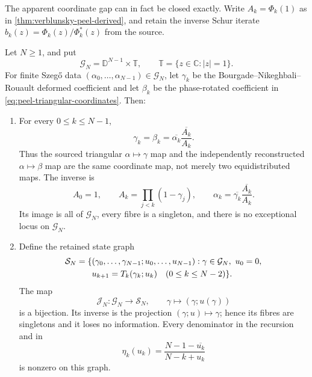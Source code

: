 \begin{sloppypar}
The apparent coordinate gap can in fact be closed exactly.  Write
$A_k=\Phi_k(1)$ as in \cref{thm:verblunsky-peel-derived}, and retain the inverse Schur
iterate $b_k(z)=\Phi_k(z)/\Phi_k^*(z)$ from the source.

\begin{theorem}
\label{thm:gamma-beta-jet-lift}
Let $N\geq1$, and put
\[
 \mathcal G_N=\mathbb D^{N-1}\times\mathbb T,
 \qquad \mathbb T=\{z\in\mathbb C:|z|=1\}.
\]
For finite Szeg\H{o} data
$(\alpha_0,\ldots,\alpha_{N-1})\in\mathcal G_N$, let
$\gamma_k$ be the Bourgade--Nikeghbali--Rouault deformed coefficient and let
$\beta_k$ be the phase-rotated coefficient in
\eqref{eq:peel-triangular-coordinates}.  Then:
\begin{enumerate}
 \item For every $0\leq k\leq N-1$,
 \begin{equation}
  \gamma_k=\beta_k
  =\overline{\alpha_k}\frac{\overline{A_k}}{A_k}.
  \label{eq:gamma-beta-literal}
 \end{equation}
 Thus the sourced triangular $\alpha\mapsto\gamma$ map and the independently
 reconstructed $\alpha\mapsto\beta$ map are the same coordinate map, not merely two
 equidistributed maps.  The inverse is
 \begin{equation}
  A_0=1,
  \qquad A_k=\prod_{j<k}(1-\gamma_j),
  \qquad
  \alpha_k=\overline{\gamma_k}\frac{\overline{A_k}}{A_k}.
  \label{eq:gamma-alpha-explicit-inverse}
 \end{equation}
 Its image is all of $\mathcal G_N$, every fibre is a singleton, and there is no
 exceptional locus on $\mathcal G_N$.

 \item Define the retained state graph
 \begin{align}
  \mathcal S_N=\{&(\gamma_0,\ldots,\gamma_{N-1};u_0,\ldots,u_{N-1}):
  \gamma\in\mathcal G_N,\ u_0=0,\notag\\
  &u_{k+1}=T_k(\gamma_k;u_k)\quad(0\leq k\leq N-2)\}.
  \label{eq:gamma-state-graph}
 \end{align}
 The map
 \begin{equation}
  \mathcal J_N:\mathcal G_N\longrightarrow\mathcal S_N,
  \qquad
  \gamma\longmapsto(\gamma;u(\gamma))
  \label{eq:gamma-jet-lift-map}
 \end{equation}
 is a bijection.  Its inverse is the projection
 $(\gamma;u)\mapsto\gamma$; hence its fibres are singletons and it loses no
 information.  Every denominator in the recursion and in
 \begin{equation}
  \eta_k(u_k)=\frac{N-1-\overline{u_k}}{N-k+u_k}
  \label{eq:gamma-lift-eta}
 \end{equation}
 is nonzero on this graph.


\end{enumerate}
\end{theorem}
\end{sloppypar}
